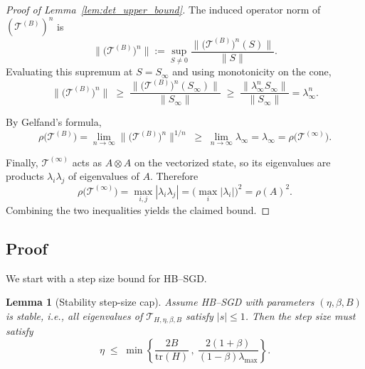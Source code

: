 \documentclass{article}
\newtheorem{lemma}{Lemma}
\begin{document}
\begin{proof}[Proof of Lemma~\ref{lem:det_upper_bound}]
The induced operator norm of $(\mathcal{T}^{(B)})^n$ is
\[
\big\|\big(\mathcal{T}^{(B)}\big)^n\big\|
:= \sup_{S\neq 0} \frac{\big\|\big(\mathcal{T}^{(B)}\big)^n(S)\big\|}{\|S\|}.
\]
Evaluating this supremum at $S=S_\infty$ and using monotonicity on the
cone,
\[
\big\|\big(\mathcal{T}^{(B)}\big)^n\big\|
\;\ge\;
\frac{\big\|\big(\mathcal{T}^{(B)}\big)^n(S_\infty)\big\|}{\|S_\infty\|}
\;\ge\;
\frac{\big\|\lambda_\infty^n S_\infty\big\|}{\|S_\infty\|}
= \lambda_\infty^n.
\]

By Gelfand’s formula,
\[
\rho\big(\mathcal{T}^{(B)}\big)
= \lim_{n\to\infty} \big\|\big(\mathcal{T}^{(B)}\big)^n\big\|^{1/n}
\;\ge\;
\lim_{n\to\infty} \lambda_\infty
= \lambda_\infty
= \rho\big(\mathcal{T}^{(\infty)}\big).
\]

Finally, $\mathcal{T}^{(\infty)}$ acts as $A\otimes A$ on the
vectorized state, so its eigenvalues are products $\lambda_i\lambda_j$
of eigenvalues of $A$. Therefore
\[
\rho\big(\mathcal{T}^{(\infty)}\big)
= \max_{i,j} |\lambda_i\lambda_j|
= \big(\max_i |\lambda_i|\big)^2
= \rho(A)^2.
\]
Combining the two inequalities yields the claimed bound.
\end{proof}

\subsection{Proof}

We start with a step size bound for HB--SGD.

\begin{lemma}[Stability step-size cap]
\label{lem:step-cap}
Assume HB--SGD with parameters $(\eta,\beta,B)$ is stable, i.e., all
eigenvalues of $\mathcal{T}_{H,\eta,\beta,B}$ satisfy $|s|\le 1$.
Then the step size must satisfy
\[
\eta \;\le\; \min\!\left\{\frac{2B}{\mathrm{tr}(H)}\,,\ \frac{2(1+\beta)}{(1-\beta)\lambda_{\max}}\right\}.
\]
\end{lemma}
\end{document}
